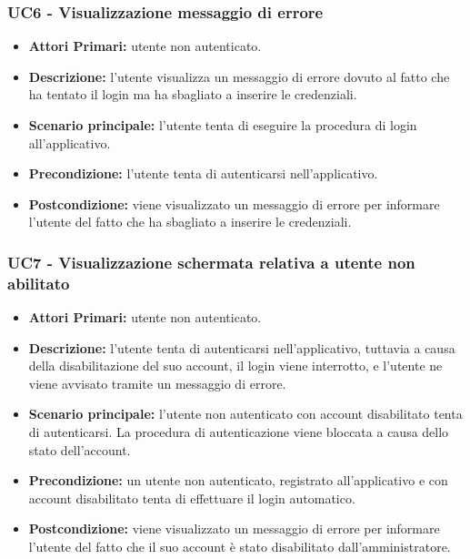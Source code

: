 \subsubsection{ UC6 - Visualizzazione messaggio di errore}
\begin{itemize}
	\item\textbf{Attori Primari:} utente non autenticato.
	\item\textbf{Descrizione:} l'utente visualizza un messaggio di errore dovuto al fatto che ha tentato il login ma ha sbagliato a inserire le credenziali.
	\item\textbf{Scenario principale:} l’utente tenta di eseguire la procedura di login all'applicativo.
	\item\textbf{Precondizione:} l'utente tenta di autenticarsi nell'applicativo.
	\item\textbf{Postcondizione:} viene visualizzato un messaggio di errore per informare l'utente del fatto che ha sbagliato a inserire le credenziali.
\end{itemize}

\subsubsection{ UC7 - Visualizzazione schermata relativa a utente non abilitato}
\begin{itemize}
           	\item\textbf{Attori Primari:} utente non autenticato.
           	\item\textbf{Descrizione:} l'utente tenta di autenticarsi nell'applicativo, tuttavia a causa della disabilitazione del suo account, il login viene interrotto, e
           	l'utente ne viene avvisato tramite un messaggio di errore.
           	\item\textbf{Scenario principale:} l’utente non autenticato con account disabilitato tenta di autenticarsi. 
           	La procedura di autenticazione viene bloccata a causa dello stato dell'account.
           	\item\textbf{Precondizione:} un utente non autenticato, registrato all'applicativo e con account disabilitato tenta di effettuare il login automatico. 
           	\item\textbf{Postcondizione:} viene visualizzato un messaggio di errore per informare l'utente del fatto che il suo account è stato disabilitato dall'amministratore.
\end{itemize}

